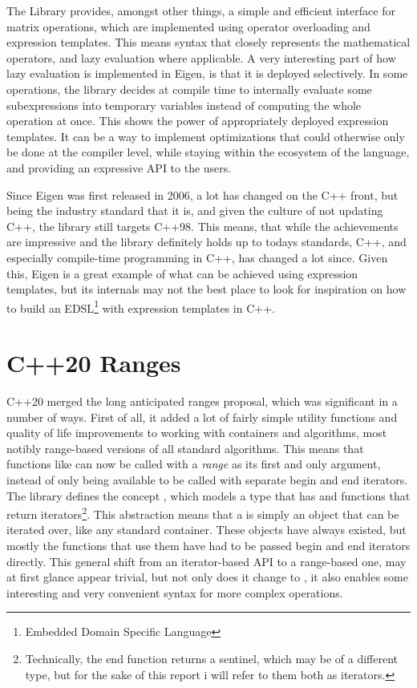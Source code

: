 The Library provides, amongst other things, a simple and efficient interface for matrix operations, which are implemented using operator overloading and expression templates. This means syntax that closely represents the mathematical operators, and lazy evaluation where applicable. A very interesting part of how lazy evaluation is implemented in Eigen, is that it is deployed selectively. In some operations, the library decides at compile time to internally evaluate some subexpressions into temporary variables instead of computing the whole operation at once. This shows the power of appropriately deployed expression templates. It can be a way to implement optimizations that could otherwise only be done at the compiler level, while staying within the ecosystem of the language, and providing an expressive API to the users.

Since Eigen was first released in 2006, a lot has changed on the C++ front, but being the industry standard that it is, and given the culture of not updating C++, the library still targets C++98. This means, that while the achievements are impressive and the library definitely holds up to todays standards, C++, and especially compile-time programming in C++, has changed a lot since. Given this, Eigen is a great example of what can be achieved using expression templates, but its internals may not the best place to look for inspiration on how to build an EDSL\footnote{Embedded Domain Specific Language} with expression templates in C++.

\section{C++20 Ranges}


C++20\autocite{C++Std} merged the long anticipated ranges proposal\autocite{P0896R4}, which was significant in a number of ways. First of all, it added a lot of fairly simple utility functions and quality of life improvements to working with containers and algorithms, most notibly range-based versions of all standard algorithms. This means that functions like  can now be called with a \emph{range} as its first and only argument, instead of only being available to be called with separate begin and end iterators. The library defines the concept , which models a type that has  and  functions that return iterators\footnote{Technically, the end function returns a sentinel, which may be of a different type, but for the sake of this report i will refer to them both as iterators.}. This abstraction means that a  is simply an object that can be iterated over, like any standard container. These objects have always existed, but mostly the functions that use them have had to be passed begin and end iterators directly. This general shift from an iterator-based API to a range-based one, may at first glance appear trivial, but not only does it change  to , it also enables some interesting and very convenient syntax for more complex operations.


